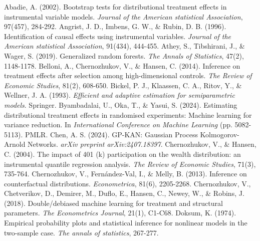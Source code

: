 \documentclass[final,3p,fleqn, 10pt]{elsarticle}
\begin{document}
\vskip 0.2in
\begin{thebibliography}{99}
 Abadie, A. (2002). Bootstrap tests for distributional treatment effects in instrumental variable models. \textit{Journal of the American statistical Association}, 97(457), 284-292.
 Angrist, J. D., Imbens, G. W., \& Rubin, D. B. (1996). Identification of causal effects using instrumental variables. \textit{Journal of the American statistical Association}, 91(434), 444-455.
 Athey, S., Tibshirani, J., \& Wager, S. (2019). Generalized random forests. \textit{The Annals of Statistics}, 47(2), 1148-1178. %
 Belloni, A., Chernozhukov, V., \& Hansen, C. (2014). Inference on treatment effects after selection among high-dimensional controls. \textit{The Review of Economic Studies}, 81(2), 608-650.
 Bickel, P. J., Klaassen, C. A., Ritov, Y., \& Wellner, J. A. (1993). \textit{Efficient and adaptive estimation for semiparametric models}. Springer.
 Byambadalai, U., Oka, T., \& Yasui, S. (2024). Estimating distributional treatment effects in randomised experiments: Machine learning for variance reduction. In \textit{International Conference on Machine Learning} (pp. 5082-5113). PMLR.
 Chen, A. S. (2024). GP-KAN: Gaussian Process Kolmogorov-Arnold Networks. \textit{arXiv preprint arXiv:2407.18397}.
 Chernozhukov, V., \& Hansen, C. (2004). The impact of 401 (k) participation on the wealth distribution: an instrumental quantile regression analysis. \textit{The Review of Economic Studies}, 71(3), 735-764.
 Chernozhukov, V., Fern{\'a}ndez-Val, I., \& Melly, B. (2013). Inference on counterfactual distributions. \textit{Econometrica}, 81(6), 2205-2268.
 Chernozhukov, V., Chetverikov, D., Demirer, M., Duflo, E., Hansen, C., Newey, W., \& Robins, J. (2018). Double/debiased machine learning for treatment and structural parameters. \textit{The Econometrics Journal}, 21(1), C1-C68.
 Doksum, K. (1974). Empirical probability plots and statistical inference for nonlinear models in the two-sample case. \textit{The annals of statistics}, 267-277.

\end{thebibliography}
\end{document}
